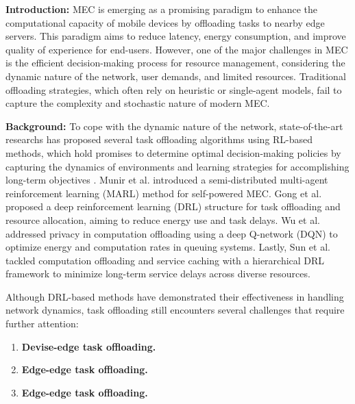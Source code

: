 \documentclass[12pt]{article}
\begin{document}
	
\vspace{0mm}
\noindent\large\textbf{Introduction: }
\small
MEC is emerging as a promising paradigm to enhance the computational capacity of mobile devices by offloading tasks to nearby edge servers. This paradigm aims to reduce latency, energy consumption, and improve quality of experience for end-users. However, one of the major challenges in MEC is the efficient decision-making process for resource management, considering the dynamic nature of the network, user demands, and limited resources. Traditional offloading strategies, which often rely on heuristic or single-agent models, fail to capture the complexity and stochastic nature of modern MEC. \\\vspace{-2mm}

\noindent\large\textbf{Background: }\small
To cope with the dynamic nature of the network, state-of-the-art researchs has proposed several task offloading algorithms using RL-based methods, which hold promises to determine optimal decision-making policies by capturing the dynamics of environments and learning strategies for accomplishing long-term objectives \cite{arulkumaran2017deep}. Munir et al. introduced a semi-distributed multi-agent reinforcement learning (MARL) method for self-powered MEC. Gong et al. proposed a deep reinforcement learning (DRL) structure for task offloading and resource allocation, aiming to reduce energy use and task delays. Wu et al. addressed privacy in computation offloading using a deep Q-network (DQN) to optimize energy and computation rates in queuing systems. Lastly, Sun et al. tackled computation offloading and service caching with a hierarchical DRL framework to minimize long-term service delays across diverse resources.

 	Although DRL-based methods have demonstrated their effectiveness in handling network dynamics, task offloading still encounters several challenges that require further attention: 

 	\begin{enumerate}
 		\item\textbf{\hspace{2mm}Devise-edge task offloading.}  
 		\item\textbf{\hspace{2mm}Edge-edge task offloading.} 
 		\item\textbf{\hspace{2mm}Edge-edge task offloading.}
 	\end{enumerate}
\end{document}

